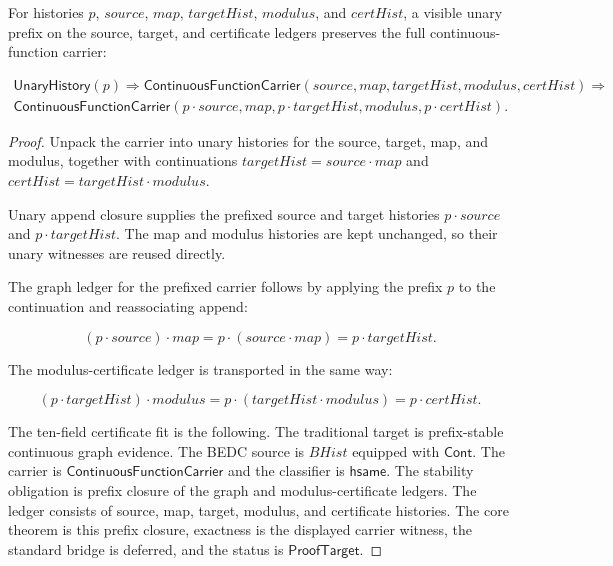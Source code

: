 \begin{theorem}
\label{thm:continuous-function-carrier-prefix-closed}
For histories $p$, $source$, $map$, $targetHist$, $modulus$, and $certHist$, a
visible unary prefix on the source, target, and certificate ledgers preserves
the full continuous-function carrier:

$$
\begin{array}{l}
\mathsf{UnaryHistory}(p)
\Longrightarrow
\mathsf{ContinuousFunctionCarrier}(source,map,targetHist,modulus,certHist)
\Longrightarrow
\\
\mathsf{ContinuousFunctionCarrier}(p\cdot source,map,p\cdot targetHist,modulus,
p\cdot certHist).
\end{array}
$$
\end{theorem}
\begin{proof}
Unpack the carrier into unary histories for the source, target, map, and
modulus, together with continuations $targetHist=source\cdot map$ and
$certHist=targetHist\cdot modulus$.

Unary append closure supplies the prefixed source and target histories
$p\cdot source$ and $p\cdot targetHist$. The map and modulus histories are
kept unchanged, so their unary witnesses are reused directly.

The graph ledger for the prefixed carrier follows by applying the prefix $p$ to
the continuation and reassociating append:

$$
(p\cdot source)\cdot map
=
p\cdot(source\cdot map)
=
p\cdot targetHist.
$$

The modulus-certificate ledger is transported in the same way:

$$
(p\cdot targetHist)\cdot modulus
=
p\cdot(targetHist\cdot modulus)
=
p\cdot certHist.
$$

The ten-field certificate fit is the following. The traditional target is
prefix-stable continuous graph evidence. The BEDC source is $BHist$ equipped
with $\mathsf{Cont}$. The carrier is $\mathsf{ContinuousFunctionCarrier}$ and
the classifier is $\mathsf{hsame}$. The stability obligation is prefix closure
of the graph and modulus-certificate ledgers. The ledger consists of source,
map, target, modulus, and certificate histories. The core theorem is this
prefix closure, exactness is the displayed carrier witness, the standard bridge
is deferred, and the status is $\mathsf{ProofTarget}$.
\end{proof}

